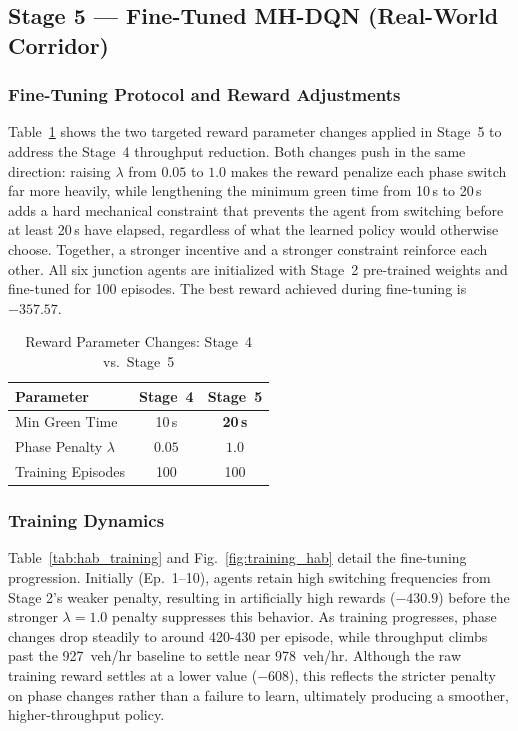 \documentclass[lettersize,journal]{IEEEtran}
\begin{document}
\subsection{Stage 5 --- Fine-Tuned MH-DQN (Real-World Corridor)}
\label{sec:stage5}

\subsubsection{Fine-Tuning Protocol and Reward Adjustments}

Table~\ref{tab:reward_changes} shows the two targeted reward parameter
changes applied in Stage~5 to address the Stage~4 throughput reduction.
Both changes push in the same direction: raising $\lambda$ from $0.05$ to
$1.0$ makes the reward penalize each phase switch far more heavily, while
lengthening the minimum green time from 10\,s to 20\,s adds a hard
mechanical constraint that prevents the agent from switching before at
least 20\,s have elapsed, regardless of what the learned policy would
otherwise choose. Together, a stronger incentive and a stronger constraint
reinforce each other. All six junction agents are initialized with
Stage~2 pre-trained weights and fine-tuned for 100 episodes. The best
reward achieved during fine-tuning is $-357.57$.

\begin{table}[!t]
\caption{Reward Parameter Changes: Stage~4 vs.\ Stage~5%
\label{tab:reward_changes}}
\centering
\renewcommand{\arraystretch}{1.2}
\begin{tabular}{@{}lcc@{}}
\toprule
\textbf{Parameter}        & \textbf{Stage~4} & \textbf{Stage~5} \\
\midrule
Min Green Time            & 10\,s   & \textbf{20\,s} \\
Phase Penalty $\lambda$   & $0.05$  & $\mathbf{1.0}$ \\
Training Episodes         & 100     & 100            \\
\bottomrule
\end{tabular}
\end{table}

\subsubsection{Training Dynamics}

Table~\ref{tab:hab_training} and Fig.~\ref{fig:training_hab} detail the fine-tuning progression. Initially (Ep.~1--10), agents retain high switching frequencies from Stage 2's weaker penalty, resulting in artificially high rewards ($-430.9$) before the stronger $\lambda=1.0$ penalty suppresses this behavior. As training progresses, phase changes drop steadily to around 420-430 per episode, while throughput climbs past the 927~veh/hr baseline to settle near 978~veh/hr. Although the raw training reward settles at a lower value ($-608$), this reflects the stricter penalty on phase changes rather than a failure to learn, ultimately producing a smoother, higher-throughput policy.
\end{document}

